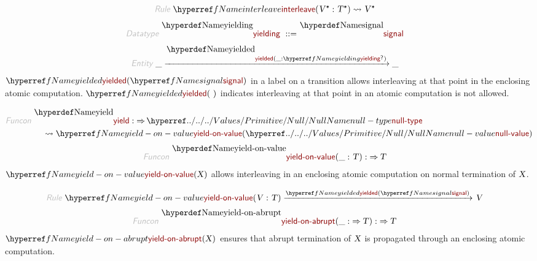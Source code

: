 \begin{align*}
  \KEY{Rule} ~ 
    & \NAMEREF{interleave}
        ( \VAR{V}\STAR : \VAR{T}\STAR ) \leadsto
        \VAR{V}\STAR
\end{align*}
\begin{align*}
  \KEY{Datatype} ~ 
  \NAMEDECL{yielding}  
  ~ ::= ~ & \NAMEDECL{signal} 
\end{align*}
\begin{align*}
  \KEY{Entity} ~ 
  & \_ \xrightarrow{\NAMEDECL{yielded}(\_ : \NAMEREF{yielding}\QUERY)} \_
\end{align*}
$\SHADE{\NAMEREF{yielded}
           ( \NAMEREF{signal} )}$ in a label on a transition allows interleaving at that point
  in the enclosing atomic computation.
  $\SHADE{\NAMEREF{yielded}
           (  ~  )}$ indicates interleaving at that point in an atomic computation
  is not allowed.

\begin{align*}
  \KEY{Funcon} ~ 
  & \NAMEDECL{yield} :  \TO \NAMEHYPER{../../../Values/Primitive}{Null}{null-type} \\
  & \quad \leadsto \NAMEREF{yield-on-value}
                     ( \NAMEHYPER{../../../Values/Primitive}{Null}{null-value} )
\end{align*}
\begin{align*}
  \KEY{Funcon} ~ 
  & \NAMEDECL{yield-on-value}(\_ : \VAR{T}) :  \TO \VAR{T}
\end{align*}
$\SHADE{\NAMEREF{yield-on-value}
           ( \VAR{X} )}$ allows interleaving in an enclosing atomic computation
  on normal termination of $\SHADE{\VAR{X}}$.

\begin{align*}
  \KEY{Rule} ~ 
    &  \NAMEREF{yield-on-value}
                    ( \VAR{V} : \VAR{T} ) \xrightarrow{\NAMEREF{yielded}( \NAMEREF{signal} )}_{} 
        \VAR{V}
\end{align*}
\begin{align*}
  \KEY{Funcon} ~ 
  & \NAMEDECL{yield-on-abrupt}(\_ :  \TO \VAR{T}) :  \TO \VAR{T}
\end{align*}
$\SHADE{\NAMEREF{yield-on-abrupt}
           ( \VAR{X} )}$ ensures that abrupt termination of $\SHADE{\VAR{X}}$ is propagated
  through an enclosing atomic computation.

